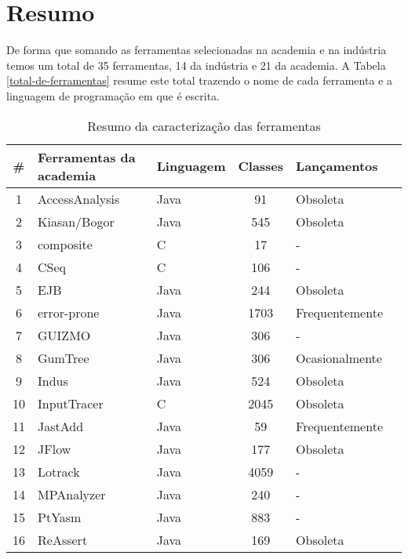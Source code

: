 \section{Resumo}

De forma que somando as ferramentas selecionadas na academia e na indústria
temos um total de 35 ferramentas, 14 da indústria e 21 da academia.  A
Tabela \ref{total-de-ferramentas} resume este total trazendo o nome de cada
ferramenta e a linguagem de programação em que é escrita.

\begin{table}[H]
  \caption{Resumo da caracterização das ferramentas}
  \centering
  \begin{tabular}{| c | l | l | c | l | l |}
    \hline
    \#  & Ferramentas da academia & Linguagem & Classes & Lançamentos \\
    \hline
    1  & AccessAnalysis          & Java   & 91    & Obsoleta       \\
    2  & Kiasan/Bogor            & Java   & 545   & Obsoleta       \\
    3  & composite               & C      & 17    & -              \\
    4  & CSeq                    & C      & 106   & -              \\
    5  & EJB                     & Java   & 244   & Obsoleta       \\
    6  & error-prone             & Java   & 1703  & Frequentemente \\
    7  & GUIZMO                  & Java   & 306   & -              \\
    8  & GumTree                 & Java   & 306   & Ocasionalmente \\
    9  & Indus                   & Java   & 524   & Obsoleta       \\
    10 & InputTracer             & C      & 2045  & Obsoleta       \\
    11 & JastAdd                 & Java   & 59    & Frequentemente \\
    12 & JFlow                   & Java   & 177   & Obsoleta       \\
    13 & Lotrack                 & Java   & 4059  & -              \\
    14 & MPAnalyzer              & Java   & 240   & -              \\
    15 & PtYasm                  & Java   & 883   & -              \\
    16 & ReAssert                & Java   & 169   & Obsoleta       \\

\end{tabular}
\end{table}
